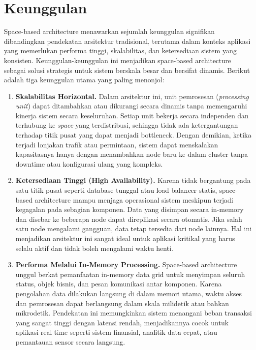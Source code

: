 \section{Keunggulan}

Space-based architecture menawarkan sejumlah keunggulan signifikan dibandingkan pendekatan arsitektur tradisional, terutama dalam konteks aplikasi yang memerlukan performa tinggi, skalabilitas, dan ketersediaan sistem yang konsisten. Keunggulan-keunggulan ini menjadikan space-based architecture sebagai solusi strategis untuk sistem berskala besar dan bersifat dinamis. Berikut adalah tiga keunggulan utama yang paling menonjol:

\begin{enumerate}
	\item \textbf{Skalabilitas Horizontal.}  
	Dalam arsitektur ini, unit pemrosesan (\textit{processing unit}) dapat ditambahkan atau dikurangi secara dinamis tanpa memengaruhi kinerja sistem secara keseluruhan. Setiap unit bekerja secara independen dan terhubung ke \textit{space} yang terdistribusi, sehingga tidak ada ketergantungan terhadap titik pusat yang dapat menjadi bottleneck. Dengan demikian, ketika terjadi lonjakan trafik atau permintaan, sistem dapat menskalakan kapasitasnya hanya dengan menambahkan node baru ke dalam cluster tanpa downtime atau konfigurasi ulang yang kompleks.
	
	\item \textbf{Ketersediaan Tinggi (High Availability).}  
	Karena tidak bergantung pada satu titik pusat seperti database tunggal atau load balancer statis, space-based architecture mampu menjaga operasional sistem meskipun terjadi kegagalan pada sebagian komponen. Data yang disimpan secara in-memory dan disebar ke beberapa node dapat direplikasi secara otomatis. Jika salah satu node mengalami gangguan, data tetap tersedia dari node lainnya. Hal ini menjadikan arsitektur ini sangat ideal untuk aplikasi kritikal yang harus selalu aktif dan tidak boleh mengalami waktu henti.
	
	\item \textbf{Performa Melalui In-Memory Processing.}  
	Space-based architecture unggul berkat pemanfaatan in-memory data grid untuk menyimpan seluruh status, objek bisnis, dan pesan komunikasi antar komponen. Karena pengolahan data dilakukan langsung di dalam memori utama, waktu akses dan pemrosesan dapat berlangsung dalam skala milidetik atau bahkan mikrodetik. Pendekatan ini memungkinkan sistem menangani beban transaksi yang sangat tinggi dengan latensi rendah, menjadikannya cocok untuk aplikasi real-time seperti sistem finansial, analitik data cepat, atau pemantauan sensor secara langsung.
\end{enumerate}

